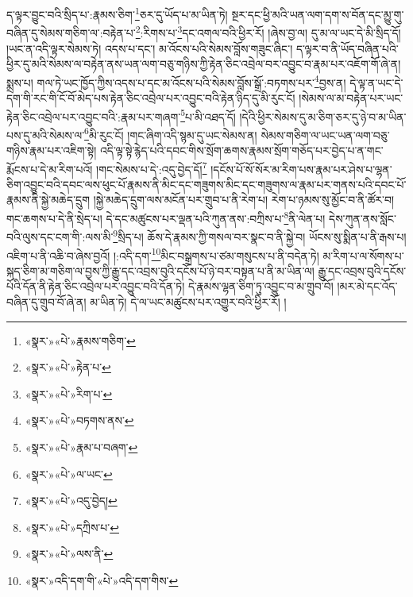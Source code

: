 ད་ལྟར་བྱུང་བའི་སྲིད་པ་:རྣམས་ཅིག་\footnote{«སྣར་»«པེ་»རྣམས་གཅིག་}ཅར་དུ་ཡོད་པ་མ་ཡིན་ཏེ། སྔར་དང་ཕྱི་མའི་ཡན་ལག་དག་ས་བོན་དང་མྱུ་གུ་བཞིན་དུ་སེམས་གཅིག་ལ་:བརྟེན་པ་\footnote{«སྣར་»«པེ་»རྟེན་པ་}:རིགས་པ་\footnote{«སྣར་»«པེ་»རིག་པ་}དང་འགལ་བའི་ཕྱིར་རོ། །ཞེས་བྱ་ལ། དུ་མ་ལ་ཡང་དེ་མི་སྲིད་དོ། །ཡང་ན་འདི་ལྟར་སེམས་ཏེ། འདས་པ་དང་། མ་འོངས་པའི་སེམས་བློས་གཟུང་ཞིང་། ད་ལྟར་བ་ནི་ཡོད་བཞིན་པའི་ཕྱིར་དུ་མའི་སེམས་ལ་བརྟེན་ནས་ཡན་ལག་བཅུ་གཉིས་ཀྱི་རྟེན་ཅིང་འབྲེལ་བར་འབྱུང་བ་རྣམ་པར་འཇོག་གོ་ཞེ་ན། སྨྲས་པ། གལ་ཏེ་ཡང་ཁྱོད་ཀྱིས་འདས་པ་དང་མ་འོངས་པའི་སེམས་བློས་སྒྲོ་:བཏགས་པར་\footnote{«སྣར་»«པེ་»བཏགས་ནས་}བྱས་ན། དེ་ལྟ་ན་ཡང་དེ་དག་གི་རང་གི་ངོ་བོ་མེད་པས་རྟེན་ཅིང་འབྲེལ་པར་འབྱུང་བའི་རྟེན་ཉིད་དུ་མི་རུང་ངོ། །སེམས་ལ་མ་བརྟེན་པར་ཡང་རྟེན་ཅིང་འབྲེལ་པར་འབྱུང་བའི་:རྣམ་པར་གཞག་\footnote{«སྣར་»«པེ་»རྣམ་པ་བཞག་}པ་མི་འཐད་དོ། །དེའི་ཕྱིར་སེམས་དུ་མ་ཅིག་ཅར་དུ་ཉེ་བ་མ་ཡིན་པས་དུ་མའི་སེམས་ལ་\footnote{«སྣར་»«པེ་»ལ་ཡང་}མི་རུང་ངོ། །གང་ཞིག་འདི་སྙམ་དུ་ཡང་སེམས་ན། སེམས་གཅིག་ལ་ཡང་ཡན་ལག་བཅུ་གཉིས་རྣམ་པར་འཇིག་སྟེ། འདི་ལྟ་སྟེ་རྙེད་པའི་དབང་གིས་སྲོག་ཆགས་རྣམས་སྲོག་གཅོད་པར་བྱེད་པ་ན་གང་རྨོངས་པ་དེ་མ་རིག་པའོ། །གང་སེམས་པ་དེ་:འདུ་བྱེད་དོ།\footnote{«སྣར་»«པེ་»འདུ་བྱེད།} །དངོས་པོ་སོ་སོར་མ་རིག་པས་རྣམ་པར་ཤེས་པ་ལྷན་ཅིག་འབྱུང་བའི་དབང་ལས་ཕུང་པོ་རྣམས་ནི་མིང་དང་གཟུགས་མིང་དང་གཟུགས་ལ་རྣམ་པར་གནས་པའི་དབང་པོ་རྣམས་ནི་སྐྱེ་མཆེད་དྲུག །སྐྱེ་མཆེད་དྲུག་ལས་མངོན་པར་གྲུབ་པ་ནི་རེག་པ། རེག་པ་ཉམས་སུ་མྱོང་བ་ནི་ཚོར་བ། གང་ཆགས་པ་དེ་ནི་སྲེད་པ། དེ་དང་མཚུངས་པར་ལྡན་པའི་ཀུན་ནས་:བཀྲིས་པ་\footnote{«སྣར་»«པེ་»དཀྲིས་པ་}ནི་ལེན་པ། དེས་ཀུན་ནས་སློང་བའི་ལུས་དང་ངག་གི་:ལས་མི་\footnote{«སྣར་»«པེ་»ལས་ནི་}སྲིད་པ། ཆོས་དེ་རྣམས་ཀྱི་གསལ་བར་སྣང་བ་ནི་སྐྱེ་བ། ཡོངས་སུ་སྨིན་པ་ནི་རྒས་པ། འཇིག་པ་ནི་འཆི་བ་ཞེས་བྱའོ། །:འདི་དག་\footnote{«སྣར་»འདི་དག་གི་«པེ་»འདི་དག་གིས་}མིང་བསྒྲགས་པ་ཙམ་གསུངས་པ་ནི་བདེན་ཏེ། མ་རིག་པ་ལ་སོགས་པ་སྐད་ཅིག་མ་གཅིག་ལ་བྱས་ཀྱི་རྒྱུ་དང་འབྲས་བུའི་དངོས་པོ་ཉེ་བར་བསྟན་པ་ནི་མ་ཡིན་ལ། རྒྱུ་དང་འབྲས་བུའི་དངོས་པོའི་དོན་ནི་རྟེན་ཅིང་འབྲེལ་པར་འབྱུང་བའི་དོན་ཏེ། དེ་རྣམས་ལྷན་ཅིག་ཏུ་འབྱུང་བ་མ་གྲུབ་བོ། །མར་མེ་དང་འོད་བཞིན་དུ་གྲུབ་བོ་ཞེ་ན། མ་ཡིན་ཏེ། དེ་ལ་ཡང་མཚུངས་པར་འགྱུར་བའི་ཕྱིར་རོ། །
